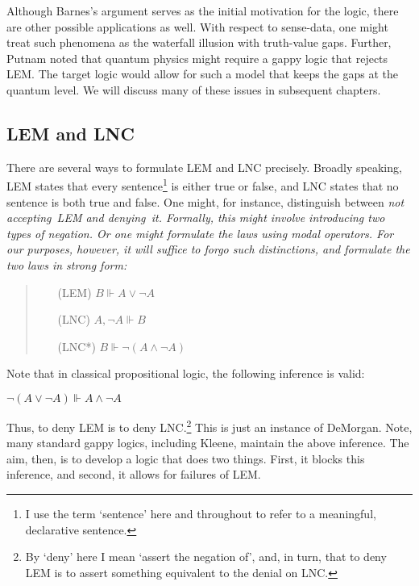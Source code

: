 Although Barnes's argument serves as the initial motivation for the logic, there are other possible applications as well. With respect to sense-data, one might treat such phenomena as the waterfall illusion with truth-value gaps. Further, Putnam \citeyear{Putnam:1957} noted that quantum physics might require a gappy logic that rejects LEM. The target logic would allow for such a model that keeps the gaps at the quantum level. We will discuss many of these issues in subsequent chapters.

\subsection{LEM and LNC}
There are several ways to formulate LEM and LNC precisely. Broadly speaking, LEM states that every sentence\footnote{I use the term `sentence' here and throughout to refer to a meaningful, declarative sentence.} is either true or false, and LNC states that no sentence is both true and false. One might, for instance, distinguish between \em not accepting\em\ LEM and \em denying\em\ it. Formally, this might involve introducing two types of negation. Or one might formulate the laws using modal operators. For our purposes, however, it will suffice to forgo such distinctions, and formulate the two laws in strong form:

\begin{quote}
\begin{enumerate}
\item[(LEM)]$B\Vdash A\vee\neg A$
\item[(LNC)]$A,\neg A\Vdash B$
\item[(LNC*)]$B\Vdash\neg(A\wedge\neg A)$
\end{enumerate}
\end{quote}

Note that in classical propositional logic, the following inference is valid:

\begin{center}
$\neg(A\vee\neg A)\Vdash A\wedge\neg A$
\end{center}

\noindent Thus, to deny LEM is to deny LNC.\footnote{By `deny' here I mean `assert the negation of', and, in turn, that to deny LEM is to assert something equivalent to the denial on LNC.} This is just an instance of DeMorgan. Note, many standard gappy logics, including Kleene, maintain the above inference. The aim, then, is to develop a logic that does two things. First, it blocks this inference, and second, it allows for failures of LEM. 

